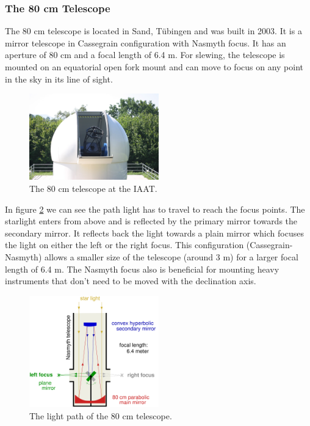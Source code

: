 \documentclass[12pt,a4paper]{article}
\begin{document}
  \subsubsection{The 80 cm Telescope}
    The 80 cm telescope is located in Sand, Tübingen and was built in 2003. It is a mirror telescope in Cassegrain configuration with Nasmyth focus. It has an aperture of 80 cm and 
    a focal length of 6.4 m. For slewing, the telescope is mounted on an equatorial open fork mount and can move to focus on any point in the sky in its line of sight.
    \begin{figure}[H]
      \centering
      \includegraphics[width=0.5\textwidth]{./Pictures/2004_img_0962.jpg}
      \caption{The 80 cm telescope at the IAAT.}
      \label{fig:80cm}
    \end{figure}
    In figure \ref{fig:80cm_lp} we can see the path light has to travel to reach the focus points. The starlight enters from above and is reflected by the primary mirror towards the 
    secondary mirror. It reflects back the light towards a plain mirror which focuses the light on either the left or the right focus. This configuration (Cassegrain-Nasmyth) allows a smaller size of the telescope
    (around 3 m) for a larger focal length of 6.4 m. The Nasmyth focus also is beneficial for mounting heavy instruments that don't need to be moved with the declination axis. 
    \begin{figure}[H]
      \centering
      \includegraphics[width=0.5\textwidth]{Pictures/Nasmyth2.pdf}
      \caption{The light path of the 80 cm telescope.}
      \label{fig:80cm_lp}
    \end{figure}
\end{document}
